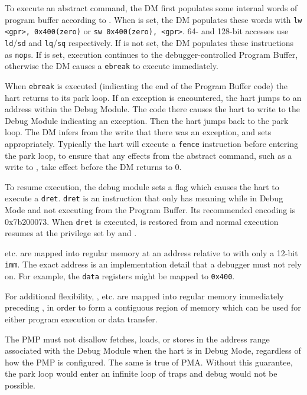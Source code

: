 To execute an abstract command, the DM first populates some internal words of
program buffer according to \RdmCommand. When \FacAccessregisterTransfer is set, the DM
populates these words with {\tt lw <gpr>, 0x400(zero)} or {\tt sw 0x400(zero), <gpr>}.
64- and 128-bit accesses use {\tt ld}/{\tt sd} and {\tt lq}/{\tt sq}
respectively. If \FacAccessregisterTransfer is not set, the DM populates these instructions as {\tt nop}s.
If \FcsrMcontrolExecute is set, execution continues to the debugger-controlled Program Buffer,
otherwise the DM causes a {\tt ebreak} to execute immediately.

When {\tt ebreak} is executed (indicating the end of the
Program Buffer code) the hart returns to its park loop. If an exception is
encountered, the hart jumps to an address within
the Debug Module. The code there causes the hart to
write to the Debug Module indicating an exception.
Then the hart jumps back to the park loop.
The DM infers from the write that there was an exception, and sets \FdmAbstractcsCmderr appropriately.
Typically the hart will execute a {\tt fence} instruction before entering the
park loop, to ensure that any effects from the abstract command, such as a
write to \RdmDataZero, take effect before the DM returns \FdmAbstractcsBusy
to 0.

To resume execution, the debug module sets a flag which causes the hart to execute a {\tt dret}.
{\tt dret} is an instruction that only has meaning while in Debug Mode and
not executing from the Program Buffer.
Its recommended encoding is 0x7b200073.
When {\tt dret} is executed, \Rpc is restored from \RcsrDpc and normal execution resumes at the
privilege set by \FcsrDcsrPrv and \FcsrDcsrV.

\RdmDataZero etc. are mapped into regular memory at an address relative to \Rzero
with only a 12-bit {\tt imm}. The exact address is an implementation
detail that a debugger must not rely on. For example, the {\tt data}
registers might be mapped to {\tt 0x400}.

For additional flexibility, \RdmProgbufZero, etc. are mapped into regular memory
immediately preceding \RdmDataZero, in order to form a contiguous region of memory which
can be used for either program execution or data transfer.

The PMP must not disallow fetches,
loads, or stores in the address range associated with the Debug Module when the
hart is in Debug Mode, regardless of how the PMP is configured.  The same is
true of PMA.  Without this guarantee, the park loop would enter an infinite
loop of traps and debug would not be possible.

